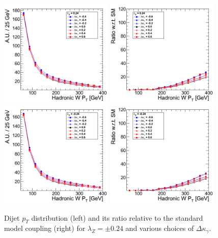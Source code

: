 \begin{figure}[h!t]
  {\centering
    \includegraphics[width=0.48\textwidth]{figs/HadronicWpT_024.png}
    \includegraphics[width=0.48\textwidth]{figs/HadronicWpT_024_ratio.png}
    \includegraphics[width=0.48\textwidth]{figs/HadronicWpT_m024.png}
    \includegraphics[width=0.48\textwidth]{figs/HadronicWpT_m024_ratio.png}
    \caption{Dijet $p_T$ distribution (left) and its ratio relative to 
    the standard model coupling (right) for $\lambda_Z = \pm 0.24$ and various choices of $\Delta{\kappa_\gamma}$.}
    \label{fig:ww_dijetPt_atgcRatio024}}
\end{figure}
